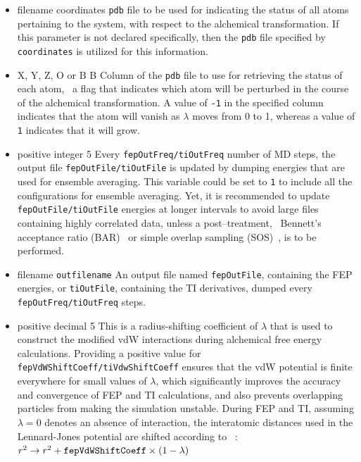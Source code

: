 \begin{itemize}
\item
{}
{filename}
{coordinates}
{{\tt pdb} file to be used for indicating the status of all
atoms pertaining to the system, with respect to the alchemical transformation.
If this parameter is not declared specifically, then the
{\tt pdb} file specified by
{\tt coordinates} is utilized for this information.}

\item
{}
{X, Y, Z, O or B}
{B}
{Column of the {\tt pdb} file to use for retrieving the status
of each atom, \ie~a flag that indicates which atom will be perturbed
in the course of the alchemical transformation.
A value of {\tt -1} in the specified column indicates that the atom will
vanish as $\lambda$ moves from 0 to 1, whereas a value of {\tt 1}
indicates that it will grow.}

\item
{}
{positive integer}
{5}
{Every {\tt fepOutFreq/tiOutFreq} number of MD steps, the output file
{\tt fepOutFile/tiOutFile} is updated by dumping energies that are
used for ensemble averaging.
This variable could be set to {\tt 1} to include all the
configurations for ensemble averaging. Yet, it is recommended
to update {\tt fepOutFile/tiOutFile}  energies at longer intervals
to avoid large files containing highly correlated data, unless a post--treatment,
\eg~Bennett's acceptance ratio (BAR)~\cite{Bennett1976} or simple overlap
sampling (SOS)~\cite{Lu2004}, is to be performed.}

\item
{}
{filename}
{{\tt outfilename}}
{An output file named {\tt fepOutFile},
containing the FEP energies, or {\tt tiOutFile}, containing the TI derivatives, dumped every {\tt fepOutFreq/tiOutFreq} steps.}

\item
{}
{positive decimal}
{5} %
{This is a radius-shifting coefficient of $\lambda$ that is used
to construct the modified vdW interactions during alchemical free energy calculations.
Providing a positive value for {\tt fepVdWShiftCoeff/tiVdwShiftCoeff} ensures that the vdW potential
is finite everywhere for small values of $\lambda$, which significantly improves the
accuracy and convergence of FEP and TI calculations, and also prevents overlapping particles
from making the simulation unstable. During FEP and TI, assuming $\lambda = 0$
denotes an absence of interaction, the interatomic distances used in
the Lennard-Jones potential are shifted according to ~\cite{Beutler1994,Zacharias1994}:
$r^2 \rightarrow r^2 + {\tt fepVdWShiftCoeff} \times (1 - \lambda)$
}


\end{itemize}
